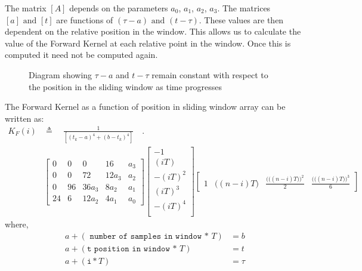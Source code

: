 \documentclass[letterpaper%
, twoside%
, 12pt%
,memoire%
, english%
,creativecommons,hyperref%
]{thETS}
\theoremstyle{newThmStyle}
\begin{document}
The matrix $[A]$ depends on the parameters $a_0$, $a_1$, $a_2$, $a_3$. The matrices $[a] \textrm{ and } [t]$ are functions of $(\tau-a) \textrm{ and } (t-\tau)$. These values are then dependent on the relative position in the window. This allows us to calculate the value of the Forward Kernel at each relative point in the window. Once this is computed it need not be computed again. 

\begin{figure}[H]
	\centering
	\resizebox{0.85\textwidth}{!}{\fbox{}}
	\parbox{0.8\textwidth}{\caption{Diagram showing $\tau -a$ and $t-\tau$ remain constant with respect to the position in the sliding window as time progresses \label{sliding_array}}}
\end{figure}

The Forward Kernel as a function of position in sliding window array can be written as:
\begin{align}
K_{F}(i)  &\triangleq \quad \frac{1}{[(t_k-a)^4+(b-t_k)^4]} \quad .\nonumber\\
&\begin{bmatrix}
0  &  0  &   0   &  16    &   a_3   \\
0  &  0  &   72   & 12a_3  &   a_2  \\
0  &  96 & 36a_3 &  8a_2  &   a_1   \\
24 &  6  & 12a_2 &  4a_1   &   a_0  
\end{bmatrix}
\begin{bmatrix}
  -1     \\
 (iT)    \\
-(iT)^2  \\
 (iT)^3  \\
-(iT)^4  \\
\end{bmatrix}
\begin{bmatrix}
1  & \big((n-i)T\big) & \frac{\Big(\big((n-i)T\big)\Big)^2}{2} & \frac{\Big(\big((n-i)T\big)\Big)^3}{6}
\end{bmatrix}
\label{Kfi}
\end{align}
where,
\begin{subequations}
\begin{align}
a+ (\texttt{ number of samples in window * } T)&= b \\ 
a+ (\texttt{t position in window * } T) &= t \\
a+ (\texttt{i}*T) &= \tau
\end{align}
\end{subequations}
\end{document}
